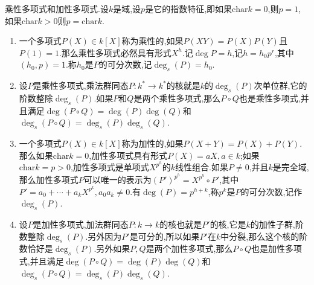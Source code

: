 乘性多项式和加性多项式.设$k$是域,设$p$是它的指数特征,即如果$\mathrm{char}k=0$,则$p=1$,如果$\mathrm{char}k>0$则$p=\mathrm{char}k$.
\begin{enumerate}
	\item 一个多项式$P(X)\in k[X]$称为乘性的,如果$P(XY)=P(X)P(Y)$且$P(1)=1$.那么乘性多项式必然具有形式$X^h$.记$\deg P=h$,记$h=h_0p^r$,其中$(h_0,p)=1$.称$h_0$是$P$的可分次数,记$\deg_s(P)=h_0$.
	\item 设$P$是乘性多项式,乘法群同态$P:k^*\to k^*$的核就是$k$的$\deg_s(P)$次单位群,它的阶数整除$\deg_s(P)$.如果$P$和$Q$是两个乘性多项式,那么$P\circ Q$也是乘性多项式,并且满足$\deg(P\circ Q)=\deg(P)\deg(Q)$和$\deg_s(P\circ Q)=\deg_s(P)\deg_s(Q)$.
	\item 一个多项式$P(X)\in k[X]$称为加性的,如果$P(X+Y)=P(X)+P(Y)$.那么如果$\mathrm{char}k=0$,加性多项式具有形式$P(X)=aX,a\in k$;如果$\mathrm{char}k=p>0$,加性多项式是单项式$X^{p^h}$的$k$线性组合.如果$P\not=0$,并且$k$是完全域,那么加性多项式$P$可以唯一的表示为$(P')^{p^h}=X^{p^h}\circ P'$,其中$P'=a_0+\cdots+a_kX^{p^k},a_0a_k\not=0$.有$\deg(P)=p^{h+k}$,称$p^k$是$P$的可分次数,记作$\deg_s(P)$.
	\item 设$P$是加性多项式,加法群同态$P:k\to k$的核也就是$P'$的核,它是$k$的加性子群,阶数整除$\deg_s(P)$.另外因为$P'$是可分的,所以如果$P'$在$k$中分裂,那么这个核的阶数恰好是$\deg_s(P)$.另外如果$P,Q$是两个加性多项式,那么$P\circ Q$也是加性多项式,并且满足$\deg(P\circ Q)=\deg(P)\deg(Q)$和$\deg_s(P\circ Q)=\deg_s(P)\deg_s(Q)$.
\end{enumerate}

